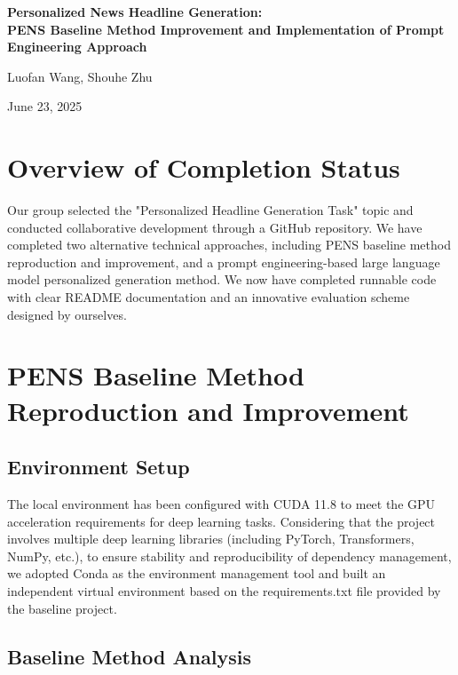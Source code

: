 \documentclass[10pt,a4paper]{article}
\begin{document}
\begin{center}
    \LARGE{\textbf{Personalized News Headline Generation:\\ PENS Baseline Method Improvement and Implementation of Prompt Engineering Approach}}
    
    \vspace{0.5cm}
    \large{Luofan Wang, Shouhe Zhu}
    
    \large{June 23, 2025}
\end{center}

\section{Overview of Completion Status}
Our group selected the "Personalized Headline Generation Task" topic and conducted collaborative development through a GitHub repository. We have completed two alternative technical approaches, including PENS baseline method reproduction and improvement, and a prompt engineering-based large language model personalized generation method. We now have completed runnable code with clear README documentation and an innovative evaluation scheme designed by ourselves.

\section{PENS Baseline Method Reproduction and Improvement}
\subsection{Environment Setup}
The local environment has been configured with CUDA 11.8 to meet the GPU acceleration requirements for deep learning tasks. Considering that the project involves multiple deep learning libraries (including PyTorch, Transformers, NumPy, etc.), to ensure stability and reproducibility of dependency management, we adopted Conda as the environment management tool and built an independent virtual environment based on the requirements.txt file provided by the baseline project.

\subsection{Baseline Method Analysis}
\end{document}
